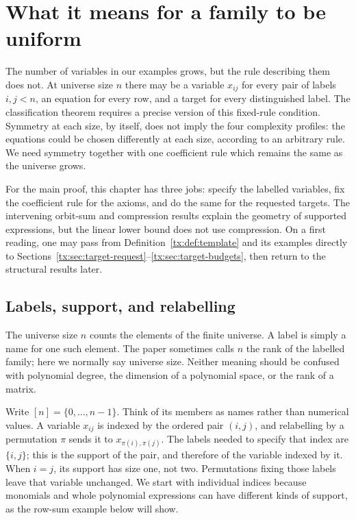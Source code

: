 \chapter{What it means for a family to be uniform}\label{tx:ch:uniformity}\label{tx:sec:systems}
The number of variables in our examples grows, but the rule describing
them does not. At universe size $n$ there may be a variable $x_{ij}$ for
every pair of labels $i,j<n$, an equation for every row, and a target
for every distinguished label. The classification theorem requires a
precise version of this fixed-rule condition. Symmetry at each size,
by itself, does not imply the four complexity profiles: the equations
could be chosen differently at each size, according to an arbitrary
rule. We need symmetry together with one coefficient rule which remains
the same as the universe grows.

For the main proof, this chapter has three jobs: specify the labelled
variables, fix the coefficient rule for the axioms, and do the same for
the requested targets. The intervening orbit-sum and compression results
explain the geometry of supported expressions, but the linear lower
bound does not use compression. On a first reading, one may pass from
Definition~\ref{tx:def:template} and its examples directly to
Sections~\ref{tx:sec:target-request}--\ref{tx:sec:target-budgets}, then
return to the structural results later.

\section{Labels, support, and relabelling}
The universe size $n$ counts the elements of the finite universe.
A label is simply a name for one such element. The paper sometimes
calls $n$ the rank of the labelled family; here we normally say
universe size. Neither meaning should be confused with polynomial
degree, the dimension of a polynomial space, or the rank of a matrix.

Write $[n]=\{0,\ldots,n-1\}$. Think of its members as names rather
than numerical values. A variable $x_{ij}$ is indexed by the ordered
pair $(i,j)$, and relabelling by a permutation $\pi$ sends it to
$x_{\pi(i),\pi(j)}$. The labels needed to specify that index are
$\{i,j\}$; this is the support of the pair, and therefore of the
variable indexed by it. When $i=j$, its support has size one, not two.
Permutations fixing those labels leave that variable unchanged. We
start with individual indices because monomials and whole polynomial
expressions can have different kinds of support, as the row-sum example
below will show.

